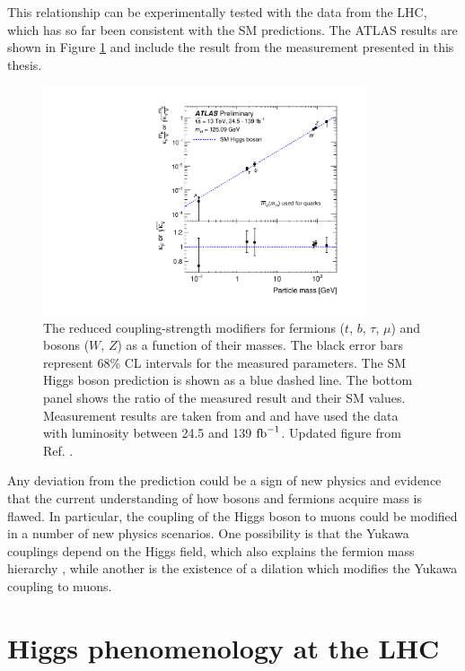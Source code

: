This relationship can be experimentally
tested with the data from the LHC, which has so far been consistent
with the SM predictions. The ATLAS results are shown in Figure
\ref{fig:the:yukawa} and include the result from the measurement
presented in this thesis.
\begin{figure}[h!]
  \centering
  \includegraphics[width=0.85\textwidth]{figures/theory/yukawa}
  \caption[Yukawa couplings]{The reduced coupling-strength modifiers
  for fermions ($t$, $b$, $\tau$, $\mu$) and bosons ($W$, $Z$) as
  a function of their masses. The black error bars represent
  68\% CL intervals for the measured parameters. The SM
  Higgs boson prediction is shown as a blue dashed line. The
  bottom panel shows the ratio of the measured result and their
  SM values. Measurement results are taken from \cite{Aad:2019mbh}
  and \cite{ATLAS-CONF-2019-028} and have used the data with
  luminosity between 24.5 and 139 $\text{fb}^{-1}$.
  Updated figure from Ref. \cite{Aad:2019mbh}.}
   \label{fig:the:yukawa}
\end{figure}

Any deviation from the prediction could
be a sign of new physics and evidence that the current understanding
of how bosons and fermions acquire mass is flawed. In particular,
the coupling of the Higgs boson to muons could be modified in a number
of new physics scenarios. One possibility is that the Yukawa couplings
depend on the Higgs field, which also explains the fermion mass
hierarchy \cite{Giudice:2008uua}, while another is the existence of
a dilation \cite{PhysRevD.80.095023} which modifies the Yukawa
coupling to muons.

\section{Higgs phenomenology at the LHC}

